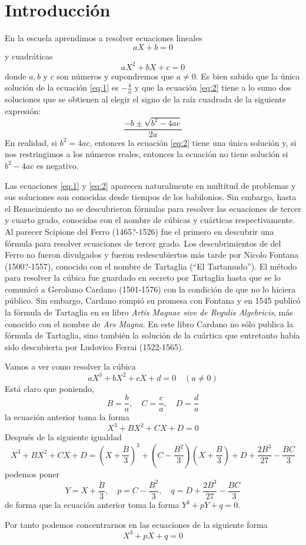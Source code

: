 \chapter{Introducción}

En la escuela aprendimos a resolver ecuaciones lineales
\begin{equation}\label{eq:1}
    aX + b = 0
\end{equation}
y cuadráticas
\begin{equation}\label{eq:2}
    aX^2 + bX + c = 0
\end{equation}
donde $a,b$ y $c$ son números y supondremos que $a\neq 0$. Es bien sabido que la única solución de la ecuación \ref{eq:1} es $-\frac{b}{a}$ y que la ecuación \ref{eq:2} tiene a lo sumo dos soluciones que se obtienen al elegir el signo de la raíz cuadrada de la siguiente expresión:
\begin{equation}\label{eq:3}
    \frac{-b\pm \sqrt{b^2-4ac}}{2a}    
\end{equation}
En realidad, si $b^2=4ac$, entonces la ecuación \ref{eq:2} tiene una única solución y, si nos restringimos a los números reales, entonces la ecuación no tiene solución si $b^2-4ac$ es negativo.

Las ecuaciones \ref{eq:1} y \ref{eq:2} aparecen naturalmente en multitud de problemas y sus soluciones son conocidas desde tiempos de los babilonios. Sin embargo, hasta el Renacimiento no se descubrieron fórmulas para resolver las ecuaciones de tercer y cuarto grado, conocidas con el nombre de cúbicas y cuárticas respectivamente. Al parecer Scipione del Ferro (1465?-1526) fue el primero en descubrir una fórmula para resolver ecuaciones de tercer grado. Los descubrimientos de del Ferro no fueron divulgados y fueron redescubiertos más tarde por Nicolo Fontana (1500?-1557), conocido con el nombre de Tartaglia (``El Tartamudo''). El método para resolver la cúbica fue guardado en secreto por Tartaglia hasta que se lo comunicó a Gerolamo Cardano (1501-1576) con la condición de que no lo hiciera público. Sin embargo, Cardano rompió su promesa con Fontana y en 1545 publicó la fórmula de Tartaglia en su libro {\it Artis Magnae sive de Regulis Algebricis}, más conocido con el nombre de {\it Ars Magna}. En este libro Cardano no sólo publica la fórmula de Tartaglia, sino también la solución de la cuártica que entretanto había sido descubierta por Ludovico Ferrai (1522-1565).

Vamos a ver como resolver la cúbica
\begin{equation}
    aX^3+bX^2+cX+d=0\quad (a\neq 0)
\end{equation}
Está claro que poniendo,
$$B=\frac{b}{a}, \quad C=\frac{c}{a}, \quad D=\frac{d}{a}$$
la ecuación anterior toma la forma
\begin{equation}
    X^3+BX^2+CX+D=0
\end{equation}
Después de la siguiente igualdad
$$X^3+BX^2+CX+D=\left(X+\frac{B}{3}\right)^3+\left(C-\frac{B^2}{3}\right)\left(X+\frac{B}{3}\right)+D+\frac{2B^3}{27}-\frac{BC}{3}$$
podemos poner
$$Y=X+\frac{B}{3}, \quad p=C-\frac{B^2}{3}, \quad q=D+\frac{2B^3}{27}-\frac{BC}{3}$$
de forma que la ecuación anterior toma la forma $Y^3+pY+q=0$.

Por tanto podemos concentrarnos en las ecuaciones de la siguiente forma
\begin{equation}
    X^3+pX+q=0
\end{equation}